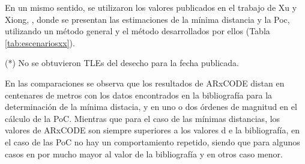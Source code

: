 En un mismo sentido, se utilizaron los valores publicados en el trabajo de Xu y  Xiong, \citep{xu2014method}, donde  se presentan las estimaciones de la m\'inima distancia y la Poc, utilizando un m\'etodo general y el m\'etodo desarrollados por ellos (Tabla \ref{tab:escenariosxx}).\\

 \begin{table}[!h]
 \caption{Comparaci\'on de ARxCODE con los resultados de  Xu \& Xiong \citep{xu2014method}.\\ Paso de propagaci\'on cien mil $\mu$s y radio de colisi\'on $r_{a}=0.01$ km.  }
\centering
{}
\begin{flushleft}\tiny{(*) No se obtuvieron TLEs del desecho para la fecha publicada.}\end{flushleft}
\label{tab:escenariosxx}
\end{table}

En las comparaciones se observa que los resultados de ARxCODE distan en centenares de metros con los datos encontrados en la bibliograf\'ia para la determinaci\'on de la m\'inima distacia, y en uno o dos \'ordenes de magnitud en el c\'alculo de la PoC.
Mientras que para el caso de las m\'inimas distancias, los valores de ARxCODE son siempre superiores a los valores d e la bibliograf\'ia, en el caso de las PoC no hay un comportamiento repetido, siendo que para algunos casos en por mucho mayor al valor de la bibliograf\'ia y en otros caso menor.\\ 


